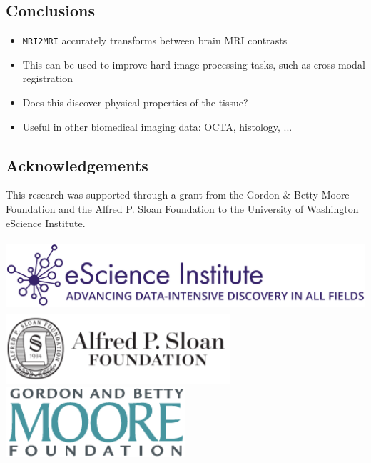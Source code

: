 \documentclass[a0, landscape]{a0poster}
\begin{document}
\begin{multicols}{3}
\section*{Conclusions}

\large
\begin{itemize}

\item \texttt{MRI2MRI} accurately transforms between brain MRI contrasts

\item This can be used to improve hard image processing tasks, such as cross-modal registration

\item Does this discover physical properties of the tissue?

\item Useful in other biomedical imaging data: OCTA, histology, ...

\end{itemize}

\color{DarkSlateGray} %


\nocite{*} %
\footnotesize  %

\subsection*{Acknowledgements} \footnotesize This research was supported through
a grant from the Gordon \& Betty Moore Foundation and the Alfred P. Sloan
Foundation to the University of Washington eScience Institute.

\includegraphics[height=2.6cm]{eSciencelogo.png}
\includegraphics[height=2.6cm]{SloanLogo.png}
\includegraphics[height=2.6cm]{MooreFdn.png}


\end{multicols}
\end{document}
